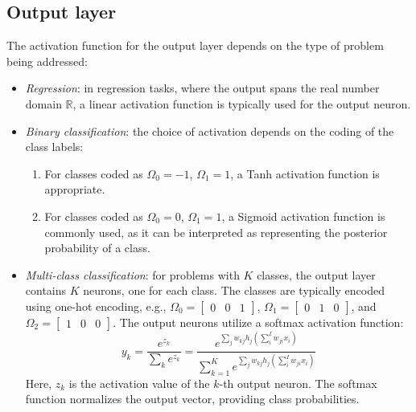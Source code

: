 \subsection{Output layer}
The activation function for the output layer depends on the type of problem being addressed:
\begin{itemize}
    \item \textit{Regression}: in regression tasks, where the output spans the real number domain $\mathbb{R}$, a linear activation function is typically used for the output neuron.
    \item \textit{Binary classification}: the choice of activation depends on the coding of the class labels: 
        \begin{enumerate}
            \item For classes coded as $\Omega_0=-1$, $\Omega_1=1$, a Tanh activation function is appropriate. 
            \item For classes coded as $\Omega_0=0$, $\Omega_1=1$, a Sigmoid activation function is commonly used, as it can be interpreted as representing the posterior probability of a class.
        \end{enumerate}
    \item \textit{Multi-class classification}: for problems with $K$ classes, the output layer contains $K$ neurons, one for each class. 
        The classes are typically encoded using one-hot encoding, e.g., $\Omega_0=\begin{bmatrix} 0 & 0 & 1 \end{bmatrix}$, $\Omega_1=\begin{bmatrix} 0 & 1 & 0 \end{bmatrix}$, and $\Omega_2=\begin{bmatrix} 1 & 0 & 0 \end{bmatrix}$.
        The output neurons utilize a softmax activation function:
        \[y_k=\dfrac{e^{z_k}}{\sum_ke^{z_k}}=\dfrac{e^{\sum_jw_{kj}h_j(\sum_i^Iw_{ji}x_i)}}{\sum_{k=1}^Ke^{\sum_jw_{kj}h_j(\sum_i^Iw_{ji}x_i)}}\]
        Here, $z_k$ is the activation value of the $k$-th output neuron. 
        The softmax function normalizes the output vector, providing class probabilities.
\end{itemize}

